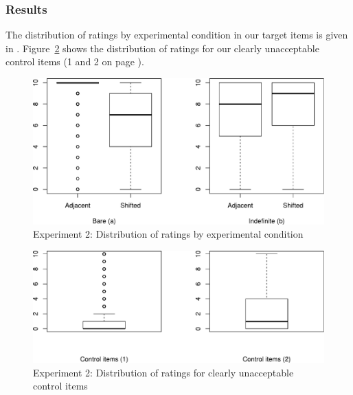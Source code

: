 \documentclass[output=paper]{langsci/langscibook}
\begin{document}
\subsubsection{Results}
The distribution of ratings by experimental condition in our target items is given in . Figure~\ref{boxplot2} shows the distribution of ratings for our clearly unacceptable control items (1 and 2 on page \pageref{ListFiller}).


\begin{figure}
	\includegraphics[width=1\linewidth]{plots/Rplot04.pdf}
	\caption{Experiment 2: Distribution of ratings by experimental condition}\label{boxplot1}
\end{figure}

\begin{figure}
    \includegraphics[width=1\linewidth]{plots/Rplot05.pdf}
	\caption{Experiment 2: Distribution of ratings for clearly unacceptable control items}\label{boxplot2}
\end{figure}
\end{document}
